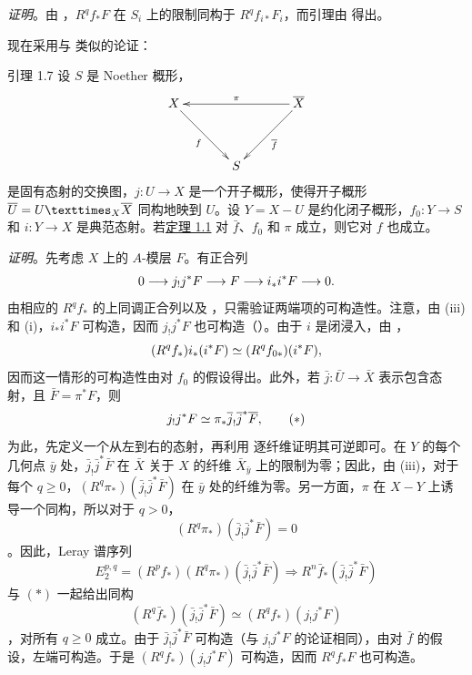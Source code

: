 \noindent
\emph{证明}。由 ，$R^qf_*F$ 在 $S_i$ 上的限制同构于 $R^qf_{i*}F_i$，而引理由  得出。

现在采用与  类似的论证：

\begin{enonce*}{引理 1.7}
设 $S$ 是 Noether 概形，
$$
\xymatrix@=1.25cm{
X        \ar[rd]_{f} &           &\bar{X} \ar[ll]_{\pi}
 \ar[ld]^{\bar{f}}\\
                 &    S      &
}
$$
是固有态射的交换图，$j:U\rightarrow X$ 是一个开子概形，使得开子概形 $\bar U=\fprod{U}{\bar X}{X}$ 同构地映到 $U$。设 $Y=X-U$ 是约化闭子概形，$f_0:Y\rightarrow S$ 和 $i:Y\rightarrow X$ 是典范态射。若\hyperref[XIV.thm1.1]{定理 1.1} 对 $\bar f$、$f_0$ 和 $\pi$ 成立，则它对 $f$ 也成立。
\end{enonce*}

\noindent
\emph{证明}。\pageoriginale 先考虑 $X$ 上的 $A$-模层 $F$。有正合列
$$
0\longrightarrow j_!j^*F\longrightarrow F\longrightarrow
i_*i^*F\longrightarrow0{}.
$$
由相应的 $R^qf_*$ 的上同调正合列以及 ，只需验证两端项的可构造性。注意，由  (iii) 和  (i)，$i_*i^*F$ 可构造，因而 $j_!j^*F$ 也可构造（）。由于 $i$ 是闭浸入，由 ，
$$
(R^qf_*)i_*(i^*F)\simeq(R^qf_{0*})(i^*F){},
$$
因而这一情形的可构造性由对 $f_0$ 的假设得出。此外，若 $\bar j:\bar U\rightarrow\bar X$ 表示包含态射，且 $\bar F=\pi^*F$，则
\begin{equation*}
j_!j^*F\simeq\pi_*\overline j_!\overline j^*\overline F{},\tag{$*$}
\end{equation*}
为此，先定义一个从左到右的态射，再利用  逐纤维证明其可逆即可。在 $Y$ 的每个几何点 $\bar y$ 处，$\bar j_!\bar j^*\bar F$ 在 $\bar X$ 关于 $X$ 的纤维 $\bar X_{\bar y}$ 上的限制为零；因此，由  (iii)，对于每个 $q\geq0$，$(R^q\pi_*)(\bar j_!\bar j^*\bar F)$ 在 $\bar y$ 处的纤维为零。另一方面，$\pi$ 在 $X-Y$ 上诱导一个同构，所以对于 $q>0$，
$$
(R^q\pi_*)(\bar j_!\bar j^*\bar F)=0
$$
。因此，Leray 谱序列
$$
E^{p,q}_2=(R^pf_*)(R^q\pi_*)(\bar j_!\bar j^*\bar F)
\Longrightarrow R^n\bar f_*(\bar j_!\bar j^*\bar F)
$$
与 $(*)$ 一起给出同构
$$
(R^q\bar f_*)(\bar j_!\bar j^*\bar F)\simeq
(R^qf_*)(j_!j^*F)
$$
，对所有 $q\geq0$ 成立。由于 $\bar j_!\bar j^*\bar F$ 可构造（与 $j_!j^*F$ 的论证相同），由对 $\bar f$ 的假设，左端可构造。于是 $(R^qf_*)(j_!j^*F)$ 可构造，因而 $R^qf_*F$ 也可构造。\pageoriginale

